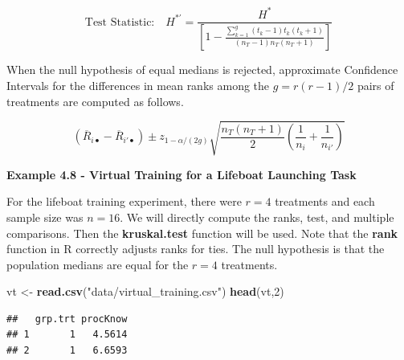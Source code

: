 \documentclass[
]{book}
\newenvironment{Shaded}{\begin{snugshade}}{\end{snugshade}}
\newcommand{\DecValTok}[1]{\textcolor[rgb]{0.00,0.00,0.81}{#1}}
\newcommand{\FunctionTok}[1]{\textcolor[rgb]{0.13,0.29,0.53}{\textbf{#1}}}
\newcommand{\NormalTok}[1]{#1}
\newcommand{\OtherTok}[1]{\textcolor[rgb]{0.56,0.35,0.01}{#1}}
\newcommand{\StringTok}[1]{\textcolor[rgb]{0.31,0.60,0.02}{#1}}
\begin{document}
\[
\mbox{Test Statistic:} \quad 
H^{*'} = 
\frac{H^*}
{\left[1-
\frac{\sum_{k=1}^g\left(t_k-1\right)t_k\left(t_k+1\right)}
{\left(n_T-1\right)n_T\left(n_T+1\right)}
\right]}
\]

When the null hypothesis of equal medians is rejected, approximate
Confidence Intervals for the differences in mean ranks among the
\(g=r(r-1)/2\) pairs of treatments are computed as follows.

\[
\left(\overline{R}_{i\bullet}-\overline{R}_{i'\bullet}\right) \pm
z_{1-\alpha/(2g)} \sqrt{\frac{n_T\left(n_T+1\right)}{2}
\left(\frac{1}{n_i}+\frac{1}{n_{i'}}\right)}
\]

\textbf{Example 4.8 - Virtual Training for a Lifeboat Launching Task}

For the lifeboat training experiment, there were \(r=4\) treatments and
each sample size was \(n=16\). We will directly compute the ranks, test,
and multiple comparisons. Then the \textbf{kruskal.test} function will
be used. Note that the \textbf{rank} function in R correctly adjusts
ranks for ties. The null hypothesis is that the population medians are
equal for the \(r=4\) treatments.

\begin{Shaded}
\begin{Highlighting}[]
\NormalTok{vt }\OtherTok{\textless{}{-}} \FunctionTok{read.csv}\NormalTok{(}\StringTok{"data/virtual\_training.csv"}\NormalTok{)}
\FunctionTok{head}\NormalTok{(vt,}\DecValTok{2}\NormalTok{)}
\end{Highlighting}
\end{Shaded}

\begin{verbatim}
##   grp.trt procKnow
## 1       1   4.5614
## 2       1   6.6593
\end{verbatim}
\end{document}
